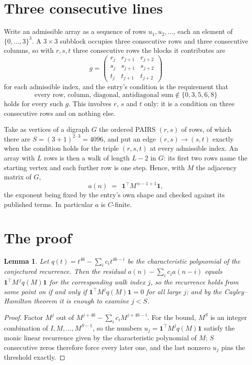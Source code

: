 \documentclass[11pt,a4paper]{article}
\theoremstyle{plain}
\newtheorem{lemma}[theorem]{Lemma}
\theoremstyle{definition}
\begin{document}
\section{Three consecutive lines}

Write an admissible array as a sequence of rows $u_1,u_2,\dots$, each an element of
$\{0,\dots,3\}^{3}$. A $3\times3$ subblock occupies three consecutive rows and
three consecutive columns, so with $r,s,t$ three consecutive rows the blocks it
contributes are
\[
g=\begin{pmatrix}r_j&r_{j+1}&r_{j+2}\\ s_j&s_{j+1}&s_{j+2}\\ t_j&t_{j+1}&t_{j+2}\end{pmatrix}
\]
for each admissible index, and the entry's condition is the requirement that
\[
\text{every row, column, diagonal, antidiagonal sum} \notin \{0,3,5,6,8\}
\]
holds for every such $g$. This involves $r$, $s$ and $t$ only: it is a condition on
three consecutive rows and on nothing else.

Take as vertices of a digraph $G$ the ordered PAIRS $(r,s)$ of rows, of which there are
$S=(3+1)^{2\cdot3}=4096$, and put an edge $(r,s)\to(s,t)$ exactly when the condition
holds for the triple $(r,s,t)$ at every admissible index. An array with $L$ rows is then a
walk of length $L-2$ in $G$: its first two rows name the starting vertex and each further
row is one step. Hence, with $M$ the adjacency matrix of $G$,
\[
a(n)\;=\;\,\mathbf{1}^{\!\top}M^{\,n-1+1}\mathbf{1},
\]
the exponent being fixed by the entry's own shape and checked against its published terms.
In particular $a$ is $C$-finite.

\section{The proof}

\begin{lemma}\label{lem:crit}
Let $q(t)=t^{46}-\sum_i c_it^{46-i}$ be the characteristic polynomial of the
conjectured recurrence. Then the residual $a(n)-\sum_ic_ia(n-i)$ equals
$\mathbf{1}^{\!\top}M^{\,j}q(M)\mathbf{1}$ for the corresponding walk index
$j$, so the recurrence holds from some point on if and only if
$\mathbf{1}^{\!\top}M^{j}q(M)\mathbf{1}=0$ for all large $j$; and by the
Cayley--Hamilton theorem it is enough to examine $j<S$.
\end{lemma}

\begin{proof}
Factor $M^{j}$ out of $M^{j+46}-\sum_ic_iM^{j+46-i}$. For the bound, $M^{S}$
is an integer combination of $I,M,\dots,M^{S-1}$, so the numbers
$u_j=\mathbf{1}^{\!\top}M^{j}q(M)\mathbf{1}$ satisfy the monic linear recurrence given by
the characteristic polynomial of $M$; $S$ consecutive zeros therefore force every later one,
and the last nonzero $u_j$ pins the threshold exactly.
\end{proof}
\end{document}
